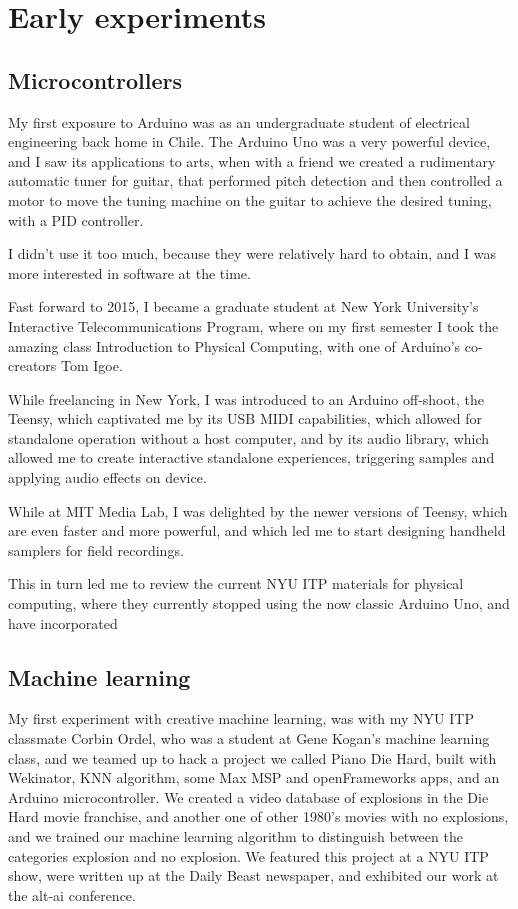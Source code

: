 \chapter{Early experiments}

\section{Microcontrollers}

My first exposure to Arduino was as an undergraduate student of electrical engineering back home in Chile. The Arduino Uno was a very powerful device, and I saw its applications to arts, when with a friend we created a rudimentary automatic tuner for guitar, that performed pitch detection and then controlled a motor to move the tuning machine on the guitar to achieve the desired tuning, with a PID controller.

I didn't use it too much, because they were relatively hard to obtain, and I was more interested in software at the time.

Fast forward to 2015, I became a graduate student at New York University's Interactive Telecommunications Program, where on my first semester I took the amazing class Introduction to Physical Computing, with one of Arduino's co-creators Tom Igoe.

While freelancing in New York, I was introduced to an Arduino off-shoot, the Teensy, which captivated me by its USB MIDI capabilities, which allowed for standalone operation without a host computer, and by its audio library, which allowed me to create interactive standalone experiences, triggering samples and applying audio effects on device.

While at MIT Media Lab, I was delighted by the newer versions of Teensy, which are even faster and more powerful, and which led me to start designing handheld samplers for field recordings.

This in turn led me to review the current NYU ITP materials for physical computing, where they currently stopped using the now classic Arduino Uno, and have incorporated 


\section{Machine learning}

My first experiment with creative machine learning, was with my NYU ITP classmate Corbin Ordel, who was a student at Gene Kogan's machine learning class, and we teamed up to hack a project we called Piano Die Hard, built with Wekinator, KNN algorithm, some Max MSP and openFrameworks apps, and an Arduino microcontroller. We created a video database of explosions in the Die Hard movie franchise, and another one of other 1980's movies with no explosions, and we trained our machine learning algorithm to distinguish between the categories explosion and no explosion. We featured this project at a NYU ITP show, were written up at the Daily Beast newspaper, and exhibited our work at the alt-ai conference.

